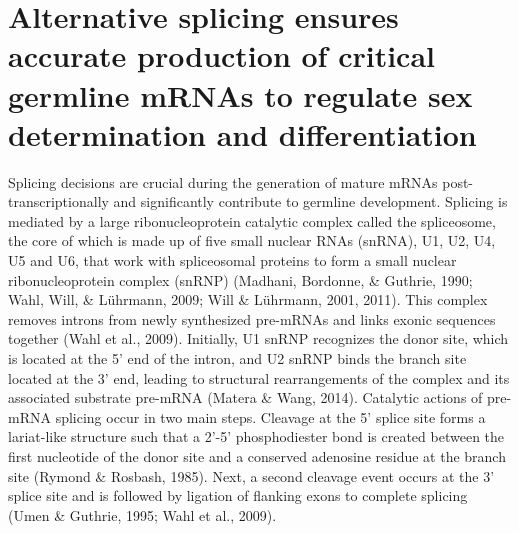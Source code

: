 \documentclass[12pt,oneside]{reedthesis}
\begin{document}
\hypertarget{alternative-splicing-ensures-accurate-production-of-critical-germline-mrnas-to-regulate-sex-determination-and-differentiation}{%
\section{Alternative splicing ensures accurate production of critical germline mRNAs to regulate sex determination and differentiation}\label{alternative-splicing-ensures-accurate-production-of-critical-germline-mrnas-to-regulate-sex-determination-and-differentiation}}

Splicing decisions are crucial during the generation of mature mRNAs
post-transcriptionally and significantly contribute to germline
development. Splicing is mediated by a large ribonucleoprotein catalytic
complex called the spliceosome, the core of which is made up of five
small nuclear RNAs (snRNA), U1, U2, U4, U5 and U6, that work with
spliceosomal proteins to form a small nuclear ribonucleoprotein complex
(snRNP) (Madhani, Bordonne, \& Guthrie, 1990; Wahl, Will, \& Lührmann, 2009; Will \& Lührmann, 2001, 2011). This
complex removes introns from newly synthesized pre-mRNAs and links
exonic sequences together (Wahl et al., 2009). Initially, U1 snRNP recognizes
the donor site, which is located at the 5' end of the intron, and U2
snRNP binds the branch site located at the 3' end, leading to structural
rearrangements of the complex and its associated substrate pre-mRNA
(Matera \& Wang, 2014). Catalytic actions of pre-mRNA splicing occur in two
main steps. Cleavage at the 5' splice site forms a lariat-like structure
such that a 2'-5' phosphodiester bond is created between the first
nucleotide of the donor site and a conserved adenosine residue at the
branch site (Rymond \& Rosbash, 1985). Next, a second cleavage event occurs at
the 3' splice site and is followed by ligation of flanking exons to
complete splicing (Umen \& Guthrie, 1995; Wahl et al., 2009).
\end{document}

